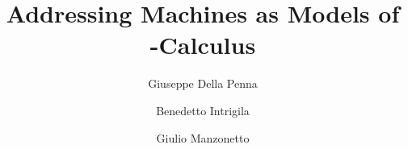 \documentclass[hidelinks]{lmcs} %
\theoremstyle{plain}\newtheorem{satz}[thm]{Satz} %
\begin{document}
\title[Instructions]{Addressing Machines as Models of \lam-Calculus}

\author[G.~Della Penna]{Giuseppe Della Penna}	%
\address{Dep.\ of Information Engineering, Computer Science and Mathematics, University of L'Aquila, Italy}	%

\author[B.~Intrigila]{Benedetto Intrigila}	%
\address{Dipartimento di Ingegneria dell'Impresa, University of Rome ``Tor Vergata'', Italy}	%

\author[G.~Manzonetto]{Giulio Manzonetto}	%
\address{Univ. Paris 13, Sorbonne Paris Cit\'e, LIPN, UMR 7030, CNRS, F-93430 Villetaneuse, France.}	%




\end{document}
